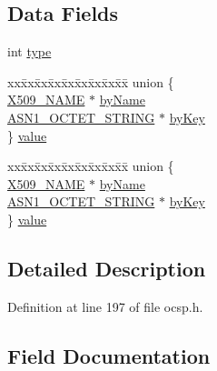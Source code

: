 \subsection*{Data Fields}
\begin{DoxyCompactItemize}
\item 
int \hyperlink{structocsp__responder__id__st_ac765329451135abec74c45e1897abf26}{type}
\item 
\begin{tabbing}
xx\=xx\=xx\=xx\=xx\=xx\=xx\=xx\=xx\=\kill
union \{\\
\>\hyperlink{crypto_2ossl__typ_8h_a5c5fc036757e87b9bd163d0221696533}{X509\_NAME} $\ast$ \hyperlink{structocsp__responder__id__st_a57c7c012d008291cbf58aa0775cbec59}{byName}\\
\>\hyperlink{crypto_2ossl__typ_8h_afbd05e94e0f0430a2b729473efec88c1}{ASN1\_OCTET\_STRING} $\ast$ \hyperlink{structocsp__responder__id__st_a4154bcbe7d56fcc5d07c7f40975d5cbb}{byKey}\\
\} \hyperlink{structocsp__responder__id__st_ad41b4459176bba0d7d3e13350f9becc3}{value}\\

\end{tabbing}\item 
\begin{tabbing}
xx\=xx\=xx\=xx\=xx\=xx\=xx\=xx\=xx\=\kill
union \{\\
\>\hyperlink{crypto_2ossl__typ_8h_a5c5fc036757e87b9bd163d0221696533}{X509\_NAME} $\ast$ \hyperlink{structocsp__responder__id__st_a57c7c012d008291cbf58aa0775cbec59}{byName}\\
\>\hyperlink{crypto_2ossl__typ_8h_afbd05e94e0f0430a2b729473efec88c1}{ASN1\_OCTET\_STRING} $\ast$ \hyperlink{structocsp__responder__id__st_a4154bcbe7d56fcc5d07c7f40975d5cbb}{byKey}\\
\} \hyperlink{structocsp__responder__id__st_acfecdd4a43f4a1c957f6352d74b4e729}{value}\\

\end{tabbing}\end{DoxyCompactItemize}


\subsection{Detailed Description}


Definition at line 197 of file ocsp.\+h.



\subsection{Field Documentation}

